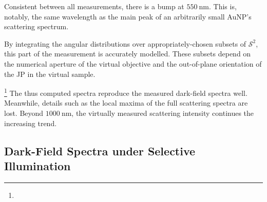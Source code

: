 \documentclass[10pt]{article}
\begin{document}
Consistent between all measurements, there is a bump at $\SI{550}{\nano\meter}$. 
This is, notably, the same wavelength as the main peak of an arbitrarily small AuNP's scattering spectrum. 





By integrating the angular distributions over appropriately-chosen subsets of $\mathcal{S}^2$, this part of the measurement is accurately modelled. 
These subsets depend on the numerical aperture of the virtual objective and the out-of-plane orientation of the JP in the virtual sample. 

\footnote{} 
The thus computed spectra reproduce the measured dark-field spectra well. 
Meanwhile, details such as the local maxima of the full scattering spectra are lost. 
Beyond $\SI{1000}{\nano\meter}$, the virtually measured scattering intensity continues the increasing trend.  








\subsection*{Dark-Field Spectra under Selective Illumination}
\end{document}
